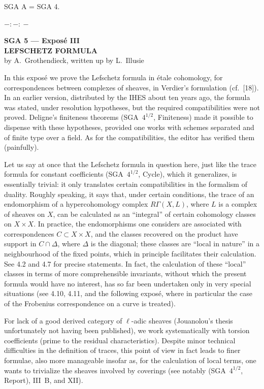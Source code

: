 \documentclass[11pt]{article}
\begin{document}
SGA A = SGA 4.

\begin{center}
$-:\!-:\!-$
\end{center}

\clearpage
\begin{center}
{\Large \textbf{SGA 5 --- Exposé III}}\\[0.4em]
{\large \textbf{LEFSCHETZ FORMULA}}\\[0.3em]
by A.~Grothendieck, written up by L.~Illusie
\end{center}

In this exposé we prove the Lefschetz formula in étale cohomology, for correspondences between complexes of sheaves, in Verdier's formulation (cf.~[18]). In an earlier version, distributed by the IHES about ten years ago, the formula was stated, under resolution hypotheses, but the required compatibilities were not proved. Deligne's finiteness theorems (SGA~$4^{1/2}$, Finiteness) made it possible to dispense with these hypotheses, provided one works with schemes separated and of finite type over a field. As for the compatibilities, the editor has verified them (painfully).

Let us say at once that the Lefschetz formula in question here, just like the trace formula for constant coefficients (SGA~$4^{1/2}$, Cycle), which it generalizes, is essentially trivial: it only translates certain compatibilities in the formalism of duality. Roughly speaking, it says that, under certain conditions, the trace of an endomorphism of a hypercohomology complex $R\Gamma(X,L)$, where $L$ is a complex of sheaves on $X$, can be calculated as an ``integral'' of certain cohomology classes on $X\times X$. In practice, the endomorphisms one considers are associated with correspondences $C\subset X\times X$, and the classes recovered on the product have support in $C\cap\Delta$, where $\Delta$ is the diagonal; these classes are ``local in nature'' in a neighbourhood of the fixed points, which in principle facilitates their calculation. See 4.2 and 4.7 for precise statements. In fact, the calculation of these ``local'' classes in terms of more comprehensible invariants, without which the present formula would have no interest, has so far been undertaken only in very special situations (see 4.10, 4.11, and the following exposé, where in particular the case of the Frobenius correspondence on a curve is treated).

For lack of a good derived category of $\ell$-adic sheaves (Jouanolou's thesis unfortunately not having been published), we work systematically with torsion coefficients (prime to the residual characteristics). Despite minor technical difficulties in the definition of traces, this point of view in fact leads to finer formulae, also more manageable insofar as, for the calculation of local terms, one wants to trivialize the sheaves involved by coverings (see notably (SGA~$4^{1/2}$, Report), III~B, and XII).
\end{document}
